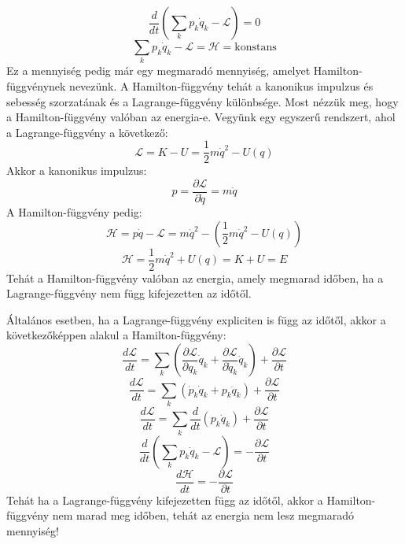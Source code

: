 \documentclass[a4paper,12pt]{article}
\begin{document}
\begin{equation}
    \frac{d}{dt} \left( \sum_k p_k \dot{q}_k - \mathcal{L} \right) = 0
\end{equation}
\begin{equation}
    \sum_k p_k \dot{q}_k - \mathcal{L} = \mathcal{H} = \text{konstans}
\end{equation}
Ez a mennyiség pedig már egy megmaradó mennyiség, amelyet Hamilton-függvénynek nevezünk. A Hamilton-függvény tehát a kanonikus impulzus és sebesség szorzatának és a Lagrange-függvény különbsége.
Most nézzük meg, hogy a Hamilton-függvény valóban az energia-e. Vegyünk egy egyszerű rendszert, ahol a Lagrange-függvény a következő:
\begin{equation}
    \mathcal{L} = K - U = \frac{1}{2}m \dot{q}^2 - U(q)
\end{equation}
Akkor a kanonikus impulzus:
\begin{equation}
    p = \frac{\partial \mathcal{L}}{\partial \dot{q}} = m \dot{q}
\end{equation}
A Hamilton-függvény pedig:
\begin{equation}
    \mathcal{H} = p \dot{q} - \mathcal{L} = m \dot{q}^2 - \left( \frac{1}{2}m \dot{q}^2 - U(q) \right)
\end{equation}
\begin{equation}
    \mathcal{H} = \frac{1}{2}m \dot{q}^2 + U(q) = K + U = E
\end{equation}
Tehát a Hamilton-függvény valóban az energia, amely megmarad időben, ha a Lagrange-függvény nem függ kifejezetten az időtől.

Általános esetben, ha a Lagrange-függvény expliciten is függ az időtől, akkor a következőképpen alakul a Hamilton-függvény:
\begin{equation}
    \frac{d\mathcal{L}}{dt} = \sum_k \left( \frac{\partial \mathcal{L}}{\partial q_k} \dot{q}_k + \frac{\partial \mathcal{L}}{\partial \dot{q}_k} \ddot{q}_k \right) + \frac{\partial \mathcal{L}}{\partial t}
\end{equation}
\begin{equation}
    \frac{d\mathcal{L}}{dt} = \sum_k \left( \dot{p}_k \dot{q}_k + p_k \ddot{q}_k \right) + \frac{\partial \mathcal{L}}{\partial t}
\end{equation}
\begin{equation}
    \frac{d\mathcal{L}}{dt} = \sum_k \frac{d}{dt} (p_k \dot{q}_k) + \frac{\partial \mathcal{L}}{\partial t}
\end{equation}
\begin{equation}
    \frac{d}{dt} \left( \sum_k p_k \dot{q}_k - \mathcal{L} \right) = - \frac{\partial \mathcal{L}}{\partial t}
\end{equation}
\begin{equation}
    \frac{d\mathcal{H}}{dt} = - \frac{\partial \mathcal{L}}{\partial t}
\end{equation}
Tehát ha a Lagrange-függvény kifejezetten függ az időtől, akkor a Hamilton-függvény nem marad meg időben, tehát az energia nem lesz megmaradó mennyiség!
\end{document}
